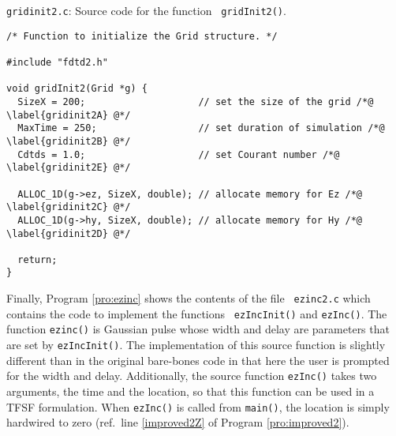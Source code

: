 \begin{program}
{\tt gridinit2.c}: Source code for the function {\tt
gridInit2()}. \label{pro:gridinit2}
\codemiddle
\begin{lstlisting}
/* Function to initialize the Grid structure. */

#include "fdtd2.h"

void gridInit2(Grid *g) {
  SizeX = 200;                    // set the size of the grid /*@ \label{gridinit2A} @*/
  MaxTime = 250;                  // set duration of simulation /*@ \label{gridinit2B} @*/
  Cdtds = 1.0;                    // set Courant number /*@ \label{gridinit2E} @*/

  ALLOC_1D(g->ez, SizeX, double); // allocate memory for Ez /*@ \label{gridinit2C} @*/
  ALLOC_1D(g->hy, SizeX, double); // allocate memory for Hy /*@ \label{gridinit2D} @*/

  return;
}
\end{lstlisting}
\end{program}


Finally, Program \ref{pro:ezinc} shows the contents of the file {\tt
  ezinc2.c} which contains the code to implement the functions {\tt
  ezIncInit()} and {\tt ezInc()}.  The function {\tt ezinc()} is
Gaussian pulse whose width and delay are parameters that are set by
{\tt ezIncInit()}.  The implementation of this source function is
slightly different than in the original bare-bones code in that here
the user is prompted for the width and delay.  Additionally, the
source function {\tt ezInc()} takes two arguments, the time and the
location, so that this function can be used in a TFSF formulation.
When {\tt ezInc()} is called from {\tt main()}, the location is simply
hardwired to zero (ref.\ line \ref{improved2Z} of Program
\ref{pro:improved2}).

